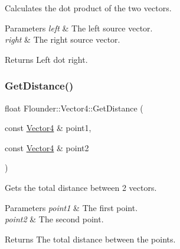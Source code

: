 Calculates the dot product of the two vectors. 


\begin{DoxyParams}{Parameters}
{\em left} & The left source vector. \\
\hline
{\em right} & The right source vector. \\
\hline
\end{DoxyParams}
\begin{DoxyReturn}{Returns}
Left dot right. 
\end{DoxyReturn}
\mbox{\label{class_flounder_1_1_vector4_acf9a2b9a400177dc82a8f27ada32fecb}} 
\subsubsection{\texorpdfstring{Get\+Distance()}{GetDistance()}}
{\footnotesize\ttfamily float Flounder\+::\+Vector4\+::\+Get\+Distance (\begin{DoxyParamCaption}\item[{const \hyperlink{class_flounder_1_1_vector4}{Vector4} \&}]{point1,  }\item[{const \hyperlink{class_flounder_1_1_vector4}{Vector4} \&}]{point2 }\end{DoxyParamCaption})\hspace{0.3cm}{\ttfamily [static]}}



Gets the total distance between 2 vectors. 


\begin{DoxyParams}{Parameters}
{\em point1} & The first point. \\
\hline
{\em point2} & The second point. \\
\hline
\end{DoxyParams}
\begin{DoxyReturn}{Returns}
The total distance between the points. 
\end{DoxyReturn}
\mbox{\label{class_flounder_1_1_vector4_a02a94e3308ba3da5ff8b845d41b8131d}} 
